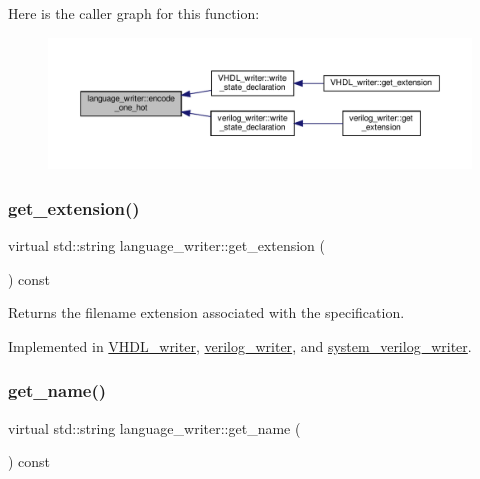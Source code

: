 Here is the caller graph for this function\+:
\nopagebreak
\begin{figure}[H]
\begin{center}
\leavevmode
\includegraphics[width=350pt]{d6/d67/classlanguage__writer_a076458c3656ec8f405db0dbf55889f69_icgraph}
\end{center}
\end{figure}
\mbox{\label{classlanguage__writer_a3bcb9c84b283d53ecc1f3c4ee8e9dc38}} 
\subsubsection{\texorpdfstring{get\+\_\+extension()}{get\_extension()}}
{\footnotesize\ttfamily virtual std\+::string language\+\_\+writer\+::get\+\_\+extension (\begin{DoxyParamCaption}{ }\end{DoxyParamCaption}) const\hspace{0.3cm}{\ttfamily [pure virtual]}}



Returns the filename extension associated with the specification. 



Implemented in \hyperlink{structVHDL__writer_aa4075167cf0d866eb3ffe02f3fcfb5c1}{V\+H\+D\+L\+\_\+writer}, \hyperlink{classverilog__writer_a4dade87869d04a1a2b166efa8c0a2253}{verilog\+\_\+writer}, and \hyperlink{classsystem__verilog__writer_a7730b4c523fbdf8e41c4416775194b2f}{system\+\_\+verilog\+\_\+writer}.

\mbox{\label{classlanguage__writer_a6eabf4ff2972e00a392a0d2a8b4c5a3a}} 
\subsubsection{\texorpdfstring{get\+\_\+name()}{get\_name()}}
{\footnotesize\ttfamily virtual std\+::string language\+\_\+writer\+::get\+\_\+name (\begin{DoxyParamCaption}{ }\end{DoxyParamCaption}) const\hspace{0.3cm}{\ttfamily [pure virtual]}}



